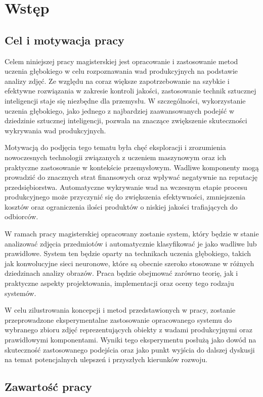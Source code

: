 \chapter{Wstęp}
\section{Cel i motywacja pracy}

Celem niniejszej pracy magisterskiej jest opracowanie i zastosowanie metod uczenia głębokiego w celu rozpoznawania wad produkcyjnych na podstawie analizy zdjęć. Ze względu na coraz większe zapotrzebowanie na szybkie i efektywne rozwiązania w zakresie kontroli jakości, zastosowanie technik sztucznej inteligencji staje się niezbędne dla przemysłu. W szczególności, wykorzystanie uczenia głębokiego, jako jednego z najbardziej zaawansowanych podejść w dziedzinie sztucznej inteligencji, pozwala na znaczące zwiększenie skuteczności wykrywania wad produkcyjnych.

Motywacją do podjęcia tego tematu była chęć eksploracji i zrozumienia nowoczesnych technologii związanych z uczeniem maszynowym oraz ich praktyczne zastosowanie w kontekście przemysłowym. Wadliwe komponenty mogą prowadzić do znacznych strat finansowych oraz wpływać negatywnie na reputację przedsiębiorstwa. Automatyczne wykrywanie wad na wczesnym etapie procesu produkcyjnego może przyczynić się do zwiększenia efektywności, zmniejszenia kosztów oraz ograniczenia ilości produktów o niskiej jakości trafiających do odbiorców.

W ramach pracy magisterskiej opracowany zostanie system, który będzie w stanie analizować zdjęcia przedmiotów i automatycznie klasyfikować je jako wadliwe lub prawidłowe. System ten będzie oparty na technikach uczenia głębokiego, takich jak konwolucyjne sieci neuronowe, które są obecnie szeroko stosowane w różnych dziedzinach analizy obrazów. Praca będzie obejmować zarówno teorię, jak i praktyczne aspekty projektowania, implementacji oraz oceny tego rodzaju systemów.

W celu zilustrowania koncepcji i metod przedstawionych w pracy, zostanie przeprowadzone eksperymentalne zastosowanie opracowanego systemu do wybranego zbioru zdjęć reprezentujących obiekty z wadami produkcyjnymi oraz prawidłowymi komponentami. Wyniki tego eksperymentu posłużą jako dowód na skuteczność zastosowanego podejścia oraz jako punkt wyjścia do dalszej dyskusji na temat potencjalnych ulepszeń i przyszłych kierunków rozwoju.

\section{Zawartość pracy}

